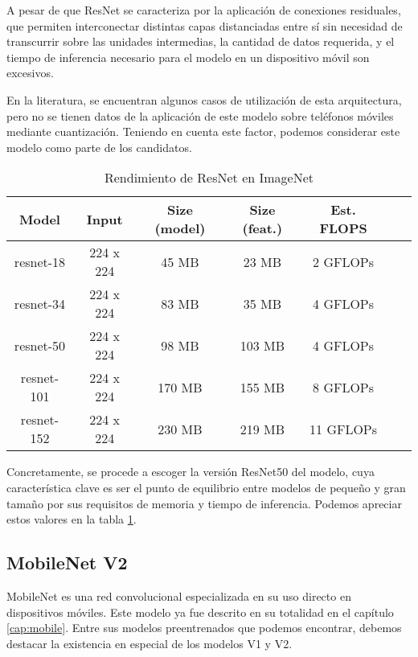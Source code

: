 A pesar de que ResNet se caracteriza por la aplicación de conexiones residuales, que permiten interconectar distintas capas distanciadas entre sí sin necesidad de transcurrir sobre las unidades intermedias, la cantidad de datos requerida, y el tiempo de inferencia necesario para el modelo en un dispositivo móvil son excesivos.

En la literatura, se encuentran algunos casos de utilización de esta arquitectura, pero no se tienen datos de la aplicación de este modelo sobre teléfonos móviles mediante cuantización. Teniendo en cuenta este factor, podemos considerar este modelo como parte de los candidatos.


\begin{table}[H]
	\centering
	\begin{tabular}{|c|c|c|c|c|c|c|}
		\hline
		\textbf{Model} & \textbf{ Input} & \textbf {Size (model)} & \textbf{Size (feat.)} & \textbf{Est. FLOPS} \\ \hline
		resnet-18 & 224 x 224 & 45 MB & 23 MB & 2 GFLOPs  \\ \hline
		resnet-34 & 224 x 224 & 83 MB & 35 MB & 4 GFLOPs   \\ \hline
		resnet-50 & 224 x 224 & 98 MB & 103 MB & 4 GFLOPs   \\ \hline
		resnet-101 & 224 x 224 & 170 MB & 155 MB & 8 GFLOPs  \\ \hline
		resnet-152 & 224 x 224 & 230 MB & 219 MB & 11 GFLOPs   \\ \hline
	\end{tabular}
	\caption{Rendimiento de ResNet en ImageNet \cite{resnetspecs}}
		\label{fig:tablaresnet}
\end{table}

Concretamente, se procede a escoger la versión ResNet50 del modelo, cuya característica clave es ser el punto de equilibrio entre modelos de pequeño y gran tamaño por sus requisitos de memoria y tiempo de inferencia. Podemos apreciar estos valores en la tabla \ref{fig:tablaresnet}.



\subsection{MobileNet V2}

MobileNet es una red convolucional especializada en su uso directo en dispositivos móviles. Este modelo ya fue descrito en su totalidad en el capítulo \ref{cap:mobile}. Entre sus modelos preentrenados que podemos encontrar, debemos destacar la existencia en especial de los modelos V1 y V2.

